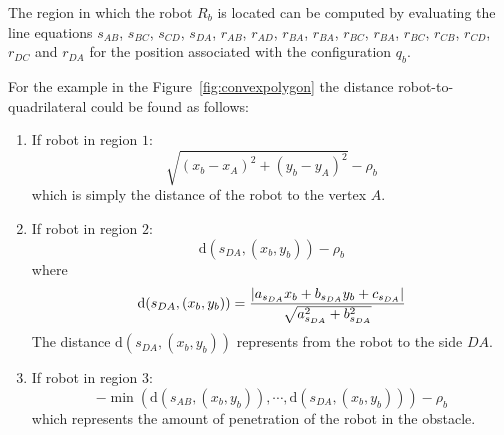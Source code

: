 \documentclass[eprint]{actapoly}
\begin{document}
\begin{enumerate}
	The region in which the robot $R_b$ is located
	can be computed by evaluating the line
 	equations 
 	$s_{AB}$, $s_{BC}$, $s_{CD}$, $s_{DA}$, $r_{AB}$, $r_{AD}$, $r_{BA}$, $r_{BA}$,
 	$r_{BC}$, $r_{BA}$, $r_{BC}$, $r_{CB}$, $r_{CD}$, $r_{DC}$ and $r_{DA}$ for 
 	the position associated with the configuration $q_b$.
 	
    
    For the example in the Figure~\ref{fig:convexpolygon} the distance
    robot-to-quadrilateral could be found as follows:
    \begin{enumerate}
    
	   	\item If robot in region $1$:
   	   	\begin{equation*}
    	    \sqrt{(x_{b} - x_{A})^2 + (y_{b} - y_{A})^2} - \rho_b
	    \end{equation*}
	    which is simply the distance of the robot to the vertex $A$.
	    
	    \item If robot in region $2$:
%	    
		\begin{equation*}
			\mathrm{d}(s_{DA}, (x_{b}, y_{b})) - \rho_b
		\end{equation*}
		where
   	   	\begin{equation*}
    	    \mathrm{d}(s_{DA}, (x_{b}, y_{b})) =\\ \frac{|a_{s_{DA}}x_{b} + b_{s_{DA}}y_{b}
    	    + c_{s_{DA}}|}{\sqrt{a_{s_{DA}}^2 + b_{s_{DA}}^2}}
	    \end{equation*}
	    The distance $\mathrm{d}(s_{DA}, (x_{b}, y_{b}))$ represents from the robot to the side $DA$.
	    
	    \item If robot in region $3$:
   	   	\begin{equation*}
    	    -\min\left(\mathrm{d}(s_{AB}, (x_{b}, y_{b})), \cdots, \mathrm{d}(s_{DA}, (x_{b}, y_{b}))\right) - \rho_b
	    \end{equation*}
	    which represents the amount of penetration of the robot in the obstacle.
	    

\end{enumerate}
\end{enumerate}
\end{document}
